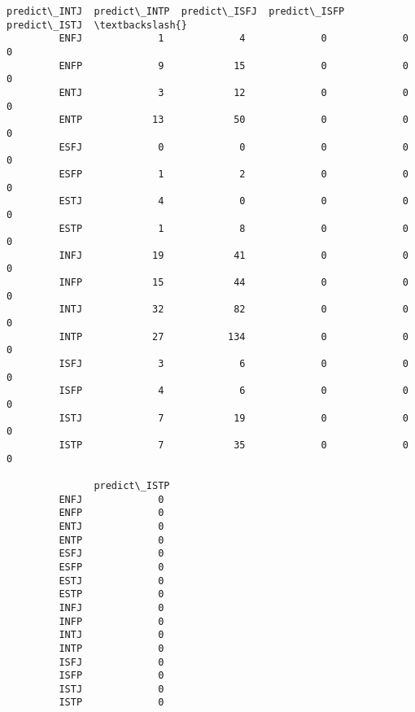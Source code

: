 \documentclass[11pt]{article}
\begin{document}
\begin{Verbatim}[commandchars=\\\{\}]
               predict\_INTJ  predict\_INTP  predict\_ISFJ  predict\_ISFP  predict\_ISTJ  \textbackslash{}
         ENFJ             1             4             0             0             0   
         ENFP             9            15             0             0             0   
         ENTJ             3            12             0             0             0   
         ENTP            13            50             0             0             0   
         ESFJ             0             0             0             0             0   
         ESFP             1             2             0             0             0   
         ESTJ             4             0             0             0             0   
         ESTP             1             8             0             0             0   
         INFJ            19            41             0             0             0   
         INFP            15            44             0             0             0   
         INTJ            32            82             0             0             0   
         INTP            27           134             0             0             0   
         ISFJ             3             6             0             0             0   
         ISFP             4             6             0             0             0   
         ISTJ             7            19             0             0             0   
         ISTP             7            35             0             0             0   
         
               predict\_ISTP  
         ENFJ             0  
         ENFP             0  
         ENTJ             0  
         ENTP             0  
         ESFJ             0  
         ESFP             0  
         ESTJ             0  
         ESTP             0  
         INFJ             0  
         INFP             0  
         INTJ             0  
         INTP             0  
         ISFJ             0  
         ISFP             0  
         ISTJ             0  
         ISTP             0  
\end{Verbatim}
            
\end{document}
